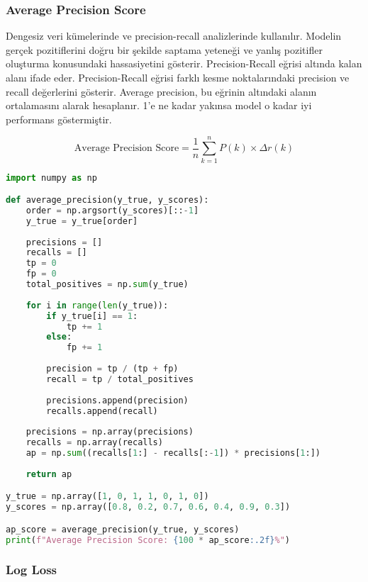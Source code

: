 \newpage

\subsubsection{Average Precision Score}

Dengesiz veri kümelerinde ve precision-recall analizlerinde kullanılır. Modelin gerçek pozitiflerini doğru bir şekilde saptama yeteneği ve yanlış pozitifler oluşturma konusundaki hassasiyetini gösterir. Precision-Recall eğrisi altında kalan alanı ifade eder. Precision-Recall eğrisi farklı kesme noktalarındaki precision ve recall değerlerini gösterir. Average precision, bu eğrinin altındaki alanın ortalamasını alarak hesaplanır. 1'e ne kadar yakınsa model o kadar iyi performans göstermiştir.

\[\text{Average Precision Score} = \frac{1}{n} \sum_{k=1}^{n} P(k) \times \Delta r(k)\]

\begin{lstlisting}[language=Python]
import numpy as np

def average_precision(y_true, y_scores):
    order = np.argsort(y_scores)[::-1]
    y_true = y_true[order]
    
    precisions = []
    recalls = []
    tp = 0
    fp = 0
    total_positives = np.sum(y_true)
    
    for i in range(len(y_true)):
        if y_true[i] == 1:
            tp += 1
        else:
            fp += 1
        
        precision = tp / (tp + fp)
        recall = tp / total_positives
        
        precisions.append(precision)
        recalls.append(recall)
    
    precisions = np.array(precisions)
    recalls = np.array(recalls)
    ap = np.sum((recalls[1:] - recalls[:-1]) * precisions[1:])
    
    return ap

y_true = np.array([1, 0, 1, 1, 0, 1, 0])
y_scores = np.array([0.8, 0.2, 0.7, 0.6, 0.4, 0.9, 0.3]) 

ap_score = average_precision(y_true, y_scores)
print(f"Average Precision Score: {100 * ap_score:.2f}%")
\end{lstlisting}

\newpage

\subsubsection{Log Loss}

